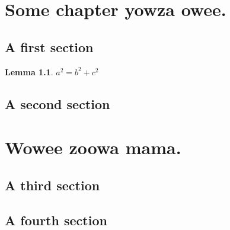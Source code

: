\documentclass{report}
\theoremstyle{plain}
\newtheorem{lemma}[subsection]{Lemma}
\theoremstyle{definition}
\theoremstyle{remark}
\numberwithin{equation}{subsection}
\begin{document}
\chapter{Some chapter yowza owee.}
\label{chapter:first}

\section{A first section}
\label{section:first}

\begin{lemma}
  \label{lemma:pythagoras}
  $a^2=b^2+c^2$
\end{lemma}

\section{A second section}
\label{section:second}


\chapter{Wowee zoowa mama.}
\label{chapter:second}

\section{A third section}
\label{section:third}

\section{A fourth section}
\label{section:fourth}
\end{document}
